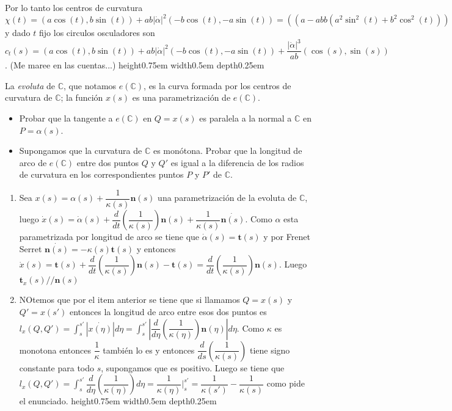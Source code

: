 \documentclass[11pt]{article}
\newcommand{\C}{\mathbb{C}}
\newcommand\abs[1]{\left\lvert#1\right\rvert}
\renewcommand\tt{\mathbf{t}}
\newcommand\nn{\mathbf{n}}
\newenvironment{proof}[1][Demostraci\'on]{\begin{trivlist}
		\item[\hskip \labelsep {\bfseries #1}]}{\end{trivlist}}
\newcommand{\qed}{\nobreak \ifvmode \relax \else
	\ifdim\lastskip<1.5em \hskip-\lastskip
	\hskip1.5em plus0em minus0.5em \fi \nobreak
	\vrule height0.75em width0.5em depth0.25em\fi}
\begin{document}
\begin{enumerate}
	Por lo tanto los centros de curvatura $\chi(t) = (a \cos(t), b \sin(t) )+ ab \abs{\dot{\alpha}}^2 (-b\cos(t), -a\sin(t)) = ((a - abb(a^2 \sin^2(t) + b^2 \cos^2(t))) \cos(t), (b - aba(a^2 \sin^2(t) + b^2 \cos^2(t))) \sin(t))$ y dado $t$ fijo los circulos osculadores son $c_t(s) = (a \cos(t), b \sin(t) )+ ab \abs{\dot{\alpha}}^2 (-b\cos(t), -a\sin(t)) + \dfrac{\abs{\dot{\alpha}}^3}{ab}(\cos(s), \sin(s))$. (Me maree en las cuentas...)\qed
	
	
	\item La \emph{evoluta} de $\C$, que notamos $e(\C)$, es la curva formada por los centros
	de curvatura de $\C$; la funci\'on $x(s)$ es una parametrizaci\'on de $e(\C)$. 
	
	\begin{itemize}
		\item Probar que la tangente a $e(\C)$ en $Q = x(s)$ es paralela a la normal a $\C$ en
		$P = \alpha(s)$.
		
		\item Supongamos que la curvatura de $\C$ es mon\'otona. Probar que la longitud de arco de $e(\C)$ entre dos puntos $Q$ y $Q'$ es igual a la diferencia de los radios de curvatura en los correspondientes puntos $P$ y $P'$ de $\C$.
	\end{itemize}
	
	\label{Ejercicio 15}
	
	\begin{proof}
		
		\begin{enumerate}
		
			\item Sea $x(s) = \alpha(s) + \dfrac{1}{\kappa(s)} \nn(s)$ una parametrizaci\'on de la evoluta de $\C$, luego $\dot{x}(s) = \dot{\alpha}(s) + \dfrac{d}{dt} \left(\dfrac{1}{\kappa(s)}\right)\nn(s) + \dfrac{1}{\kappa(s)} \dot{\nn(s)}$. Como $\alpha$ esta parametrizada por longitud de arco se tiene que $\dot{\alpha}(s) = \tt(s)$ y por Frenet Serret $\dot{\nn(s)} = - \kappa(s)\tt(s)$ y entonces $\dot{x}(s) = \tt(s) + \dfrac{d}{dt} \left(\dfrac{1}{\kappa(s)}\right)\nn(s) - \tt(s)= \dfrac{d}{dt} \left(\dfrac{1}{\kappa(s)}\right)\nn(s)$. Luego $\tt_x(s) // \nn(s)$
			
			\item NOtemos que por el item anterior se tiene que si llamamos $Q = x(s)$ y $Q' = x(s')$ entonces la longitud de arco entre esos dos puntos es $l_x(Q,Q') = \int_{s}^{s'}{\abs{\dot{x(\eta)}}d\eta} = \int_{s}^{s'}{\abs{\dfrac{d}{d\eta} \left(\dfrac{1}{\kappa(\eta)}\right)\nn(\eta)}d\eta}$. Como $\kappa$ es monotona entonces $\dfrac{1}{\kappa}$ tambi\'en lo es y entonces $\dfrac{d}{ds} \left(\dfrac{1}{\kappa(s)}\right)$ tiene signo constante para todo $s$, supongamos que es positivo. Luego se tiene que $l_x(Q,Q') = \int_{s}^{s'}{{\dfrac{d}{d\eta} \left(\dfrac{1}{\kappa(\eta)}\right)}d\eta} = \dfrac{1}{\kappa(\eta)} \rvert_{s}^{s'} = \dfrac{1}{\kappa(s')} - \dfrac{1}{\kappa(s)}$ como pide el enunciado. \qed
			
		\end{enumerate}
		
	\end{proof}
	
\end{enumerate}
\end{document}
